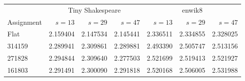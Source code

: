 \begin{tabular}{lrrr|rrr}
\toprule
& \multicolumn{3}{c|}{Tiny Shakespeare} & \multicolumn{3}{c}{enwik8} \\
Assignment & $s=13$ & $s=29$ & $s=47$ & $s=13$ & $s=29$ & $s=47$ \\
\midrule
Flat \ilm{} & 2.159404 & 2.147534 & 2.145441 & 2.336511 & 2.334855 & 2.328025 \\
\midrule
314159 & 2.289941 & 2.309861 & 2.289881 & 2.493390 & 2.505747 & 2.513156 \\
271828 & 2.294844 & 2.309640 & 2.277503 & 2.521699 & 2.519413 & 2.521927 \\
161803 & 2.291491 & 2.300090 & 2.291818 & 2.520168 & 2.506005 & 2.531988 \\
\bottomrule
\end{tabular}
